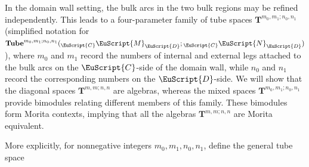 \documentclass[a4paper,11pt]{article}
\theoremstyle{definition}
\theoremstyle{remark}
\newcommand\eC           {\EuScript{C}}
\newcommand\eD           {\EuScript{D}}
\newcommand\eM          {\EuScript{M}}
\newcommand\eN         {\EuScript{N}}
\begin{document}
In the domain wall setting, the bulk arcs in the two bulk regions may be refined independently. This leads to a four-parameter family of tube spaces $\mathbf{T}^{m_0,m_1;n_0,n_1}$ (simplified notation for $\mathbf{Tube}^{m_0,m_1;n_0,n_1}({}_\eC\eM_\eD;{}_\eC\eN_\eD)$), where $m_0$ and $m_1$ record the numbers of internal and external legs attached to the bulk arcs on the $\eC$-side of the domain wall, while $n_0$ and $n_1$ record the corresponding numbers on the $\eD$-side. We will show that the diagonal spaces $\mathbf{T}^{m,m;n,n}$ are algebras, whereas the mixed spaces $\mathbf{T}^{m_0,m_1;n_0,n_1}$ provide bimodules relating different members of this family. These bimodules form Morita contexts, implying that all the algebras $\mathbf{T}^{m,m;n,n}$ are Morita equivalent.

More explicitly, for nonnegative integers $m_0,m_1,n_0,n_1$, define the general tube space 
\end{document}

